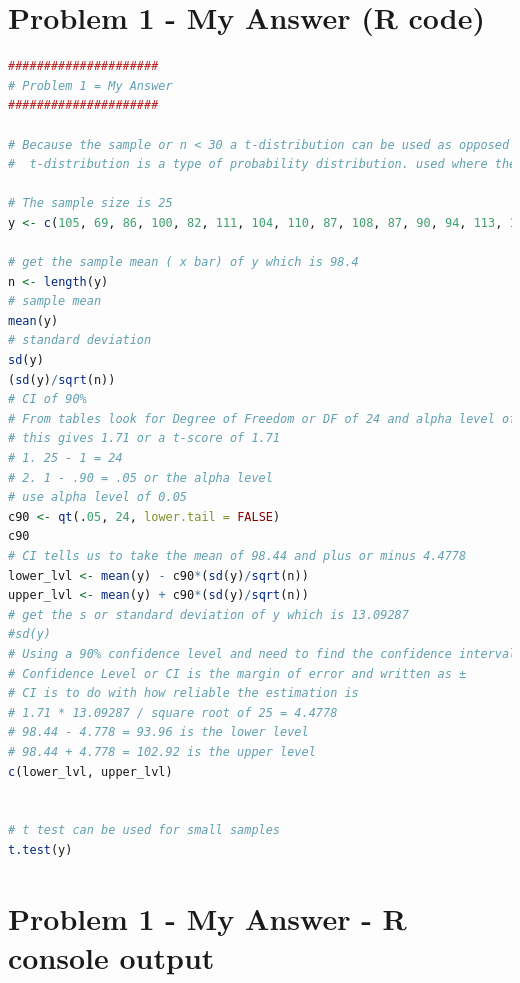 \documentclass[12pt,letterpaper]{article}
\begin{document}
\section*{Problem 1 - My Answer (R code)}
	


\begin{lstlisting}[language=R]
#####################
# Problem 1 = My Answer
#####################

# Because the sample or n < 30 a t-distribution can be used as opposed to a normal distribution
#  t-distribution is a type of probability distribution. used where the sample size is small.

# The sample size is 25
y <- c(105, 69, 86, 100, 82, 111, 104, 110, 87, 108, 87, 90, 94, 113, 112, 98, 80, 97, 95, 111, 114, 89, 95, 126, 98)

# get the sample mean ( x bar) of y which is 98.4
n <- length(y) 
# sample mean
mean(y)
# standard deviation
sd(y)
(sd(y)/sqrt(n))
# CI of 90%
# From tables look for Degree of Freedom or DF of 24 and alpha level of 0.05
# this gives 1.71 or a t-score of 1.71
# 1. 25 - 1 = 24
# 2. 1 - .90 = .05 or the alpha level
# use alpha level of 0.05
c90 <- qt(.05, 24, lower.tail = FALSE)
c90
# CI tells us to take the mean of 98.44 and plus or minus 4.4778
lower_lvl <- mean(y) - c90*(sd(y)/sqrt(n))
upper_lvl <- mean(y) + c90*(sd(y)/sqrt(n))
# get the s or standard deviation of y which is 13.09287
#sd(y)
# Using a 90% confidence level and need to find the confidence interval
# Confidence Level or CI is the margin of error and written as ±
# CI is to do with how reliable the estimation is
# 1.71 * 13.09287 / square root of 25 = 4.4778
# 98.44 - 4.778 = 93.96 is the lower level
# 98.44 + 4.778 = 102.92 is the upper level
c(lower_lvl, upper_lvl)


# t test can be used for small samples
t.test(y)

\end{lstlisting}
	
\newpage

\section*{Problem 1 - My Answer  - R console output}
	
\end{document}
